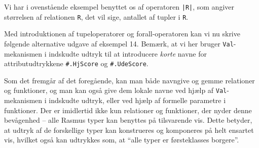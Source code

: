 \documentclass{article}
\newcounter{eks}
\begin{document}
Vi har i ovenst\aa{}ende eksempel benyttet os af operatoren \verb"|R|",
som angiver st\o{}rrelsen af relationen \verb"R", det vil sige,
antallet af tupler i \verb"R".

Med introduktionen af tupeloperatorer og forall-operatoren kan vi nu
skrive f\o{}lgende alternative udgave af eksempel 14. Bem\ae{}rk, at
vi her bruger \verb"Val"-mekanismen i indskudte udtryk til at
introducere {\em korte\/} navne for attributudtrykkene
\verb"#.HjScore" og \verb"#.UdeScore".

Som det fremg\aa{}r af det foreg\aa{}ende, kan man b\aa{}de navngive
og gemme relationer og funktioner, og man kan ogs\aa{} give
dem lokale navne ved hj\ae{}lp af \verb"Val"-mekanismen i indskudte
udtryk, eller ved hj\ae{}lp af formelle parametre i funktioner.
Der er imidlertid ikke kun relationer og funktioner, der nyder denne
bev\aa{}genhed -- alle {\sc Rasmus} typer kan benyttes p\aa{}
tilsvarende vis. Dette betyder, at udtryk af de forskellige typer
kan konstrueres og komponeres p\aa{} helt ensartet vis, hvilket ogs\aa{}
kan udtrykkes som, at ``alle typer er f\o{}rsteklasses borgere''.
\end{document}
